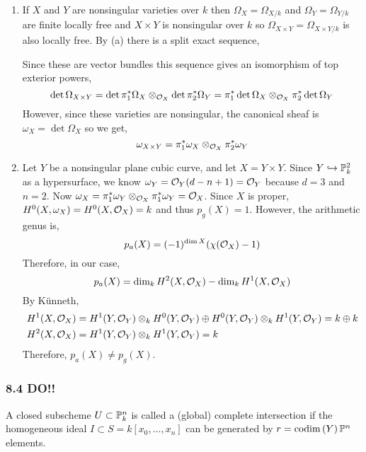 \documentclass[12pt]{article}
\begin{document}
\begin{enumerate}
\item If $X$ and $Y$ are nonsingular varieties over $k$ then $\Omega_{X} = \Omega_{X/k}$ and $\Omega_{Y} = \Omega_{Y/k}$ are finite locally free and $X \times Y$ is nonsingular over $k$ so $\Omega_{X \times Y} = \Omega_{X \times Y / k}$ is also locally free. By (a) there is a split exact sequence,
\begin{center}
\end{center}
Since these are vector bundles this sequence gives an isomorphism of top exterior powers,
\[ \det{\Omega_{X \times Y}} = \det{\pi_1^* \Omega_X} \otimes_{\struct{X}} \det{\pi_2^* \Omega_Y} = \pi_1^* \det{\Omega_X} \otimes_{\struct{X}} \pi_2^* \det{\Omega_Y} \]
However, since these varieties are nonsingular, the canonical sheaf is $\omega_X = \det{\Omega_X}$ so we get,
\[ \omega_{X \times Y} = \pi_1^* \omega_X \otimes_{\struct{X}} \pi_2^* \omega_Y \]

\item Let $Y$ be a nonsingular plane cubic curve, and let $X = Y \times Y$. Since $Y \embed \P^2_k$ as a hypersurface, we know $\omega_Y = \struct{Y}(d - n + 1) = \struct{Y}$ because $d = 3$ and $n = 2$.  Now $\omega_X = \pi_1^* \omega_Y \otimes_{\struct{X}} \pi_1^* \omega_Y = \struct{X}$. Since $X$ is proper, $H^0(X, \omega_X) = H^0(X, \struct{X}) = k$ and thus $p_g(X) = 1$. However, the arithmetic genus is,
\[ p_a(X) = (-1)^{\dim{X}} (\chi(\struct{X}) - 1) \]
Therefore, in our case,
\[ p_a(X) = \dim_k H^2(X, \struct{X}) - \dim_k H^1(X, \struct{X}) \]
By K\"{u}nneth,
\begin{align*}
H^1(X, \struct{X}) & = H^1(Y, \struct{Y}) \otimes_k H^0(Y, \struct{Y}) \oplus H^0(Y, \struct{Y}) \otimes_k H^1(Y, \struct{Y}) = k \oplus k 
\\
H^2(X, \struct{X}) & = H^1(Y, \struct{Y}) \otimes_k H^1(Y, \struct{Y}) = k 
\end{align*}
Therefore, $p_a(X) \neq p_g(X)$.
\end{enumerate}

\subsubsection{8.4 DO!!}

A closed subscheme $U \subset \P^n_k$ is called a (global) complete intersection if the homogeneous ideal $I \subset S = k[x_0, \dots, x_n]$ can be generated by $r = \codim{Y}{\P^n}$ elements.
\end{document}
